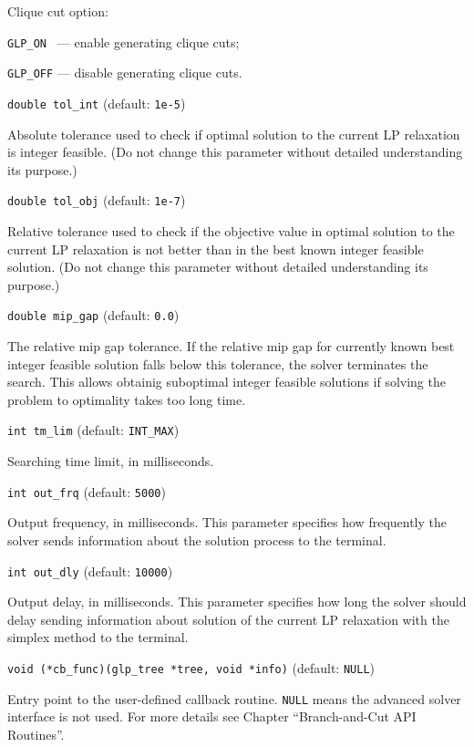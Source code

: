 Clique cut option:

\verb|GLP_ON | --- enable generating clique cuts;

\verb|GLP_OFF| --- disable generating clique cuts.

\newpage

{\tt double tol\_int} (default: {\tt 1e-5})

Absolute tolerance used to check if optimal solution to the current LP
relaxation is integer feasible. (Do not change this parameter without
detailed understanding its purpose.)

\bigskip

{\tt double tol\_obj} (default: {\tt 1e-7})

Relative tolerance used to check if the objective value in optimal
solution to the current LP relaxation is not better than in the best
known integer feasible solution. (Do not change this parameter without
detailed understanding its purpose.)

\bigskip

{\tt double mip\_gap} (default: {\tt 0.0})

The relative mip gap tolerance. If the relative mip gap for currently
known best integer feasible solution falls below this tolerance, the
solver terminates the search. This allows obtainig suboptimal integer
feasible solutions if solving the problem to optimality takes too long
time.

\bigskip

{\tt int tm\_lim} (default: {\tt INT\_MAX})

Searching time limit, in milliseconds.

\bigskip

{\tt int out\_frq} (default: {\tt 5000})

Output frequency, in milliseconds. This parameter specifies how
frequently the solver sends information about the solution process to
the terminal.

\bigskip

{\tt int out\_dly} (default: {\tt 10000})

Output delay, in milliseconds. This parameter specifies how long the
solver should delay sending information about solution of the current
LP relaxation with the simplex method to the terminal.

\bigskip

{\tt void (*cb\_func)(glp\_tree *tree, void *info)}
(default: {\tt NULL})

Entry point to the user-defined callback routine. \verb|NULL| means
the advanced solver interface is not used. For more details see Chapter
``Branch-and-Cut API Routines''.


